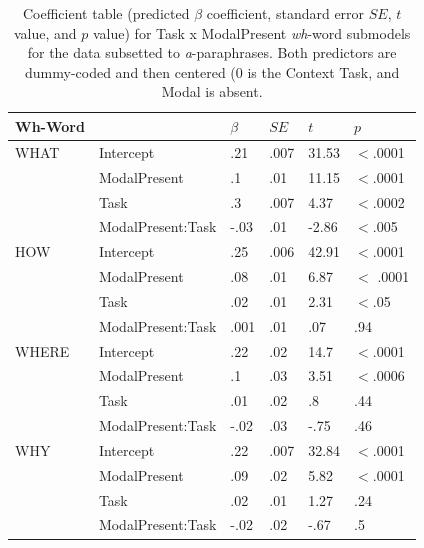 \documentclass[12pt,letterpaper,table,svgnames,dvipsnames]{article}
\begin{document}
\begin{table}
\begin{center} 
\caption{Coefficient table (predicted $\beta$ coefficient, standard error $SE$, $t$ value, and $p$ value) for Task x ModalPresent \emph{wh}-word submodels for the data subsetted to \emph{a}-paraphrases. Both predictors are dummy-coded and then centered (0 is the Context Task, and Modal is absent.} 
\label{sub-models_Task-a} 
\begin{tabular}{llllll} 
\toprule
Wh-Word & {} & $\beta$ & $SE$ & $t$ & $p$\\
\midrule
WHAT & Intercept & .21 & .007 & 31.53 & $<$.0001\\
{} & ModalPresent & .1 & .01 & 11.15 & $<$.0001\\
{} & Task & .3 & .007 & 4.37 & $<$.0002\\
{} & ModalPresent:Task & -.03 & .01 & -2.86 & $<$.005\\
\midrule
HOW & Intercept & .25 & .006 & 42.91 & $<$.0001\\
{} & ModalPresent & .08 & .01 & 6.87 & $<$ .0001\\
{} & Task & .02 & .01 & 2.31 & $<$.05\\
{} & ModalPresent:Task & .001 & .01 & .07 & .94\\
\midrule
WHERE & Intercept & .22 & .02 & 14.7 & $<$.0001\\
{} & ModalPresent & .1 & .03 & 3.51 & $<$.0006\\
{} & Task & .01 & .02 & .8 & .44\\
{} & ModalPresent:Task & -.02 & .03 & -.75 & .46\\
\midrule
WHY & Intercept & .22 & .007 & 32.84 & $<$.0001\\
{} & ModalPresent & .09 & .02 & 5.82 & $<$.0001\\
{} & Task & .02 & .01 & 1.27 & .24\\
{} & ModalPresent:Task & -.02 & .02 & -.67 & .5\\
\midrule

\end{tabular}
\end{center}
\end{table}
\end{document}
